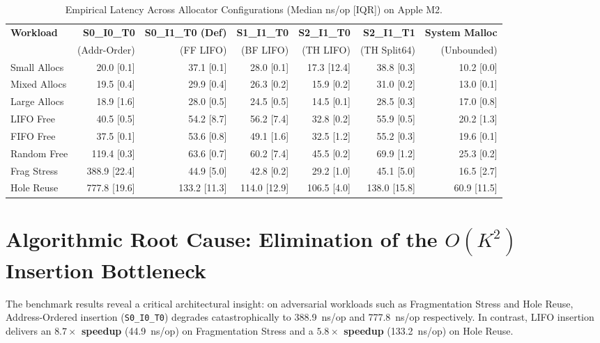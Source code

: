 \documentclass[a4paper,11pt]{report}
\begin{document}
\begin{table}[htbp]
\centering
\caption{Empirical Latency Across Allocator Configurations (Median ns/op [IQR]) on Apple M2.}
\label{tab:bench_results}
\small
\begin{tabularx}{\textwidth}{lrrrrrr}
\toprule
\textbf{Workload} & \textbf{S0\_I0\_T0} & \textbf{S0\_I1\_T0 (Def)} & \textbf{S1\_I1\_T0} & \textbf{S2\_I1\_T0} & \textbf{S2\_I1\_T1} & \textbf{System Malloc} \\
& (Addr-Order) & (FF LIFO) & (BF LIFO) & (TH LIFO) & (TH Split64) & (Unbounded) \\
\midrule
Small Allocs  & 20.0 [0.1] & 37.1 [0.1] & 28.0 [0.1] & 17.3 [12.4] & 38.8 [0.3] & 10.2 [0.0] \\
Mixed Allocs  & 19.5 [0.4] & 29.9 [0.4] & 26.3 [0.2] & 15.9 [0.2]  & 31.0 [0.2] & 13.0 [0.1] \\
Large Allocs  & 18.9 [1.6] & 28.0 [0.5] & 24.5 [0.5] & 14.5 [0.1]  & 28.5 [0.3] & 17.0 [0.8] \\
LIFO Free     & 40.5 [0.5] & 54.2 [8.7] & 56.2 [7.4] & 32.8 [0.2]  & 55.9 [0.5] & 20.2 [1.3] \\
FIFO Free     & 37.5 [0.1] & 53.6 [0.8] & 49.1 [1.6] & 32.5 [1.2]  & 55.2 [0.3] & 19.6 [0.1] \\
Random Free   & 119.4 [0.3]& 63.6 [0.7] & 60.2 [7.4] & 45.5 [0.2]  & 69.9 [1.2] & 25.3 [0.2] \\
Frag Stress   & 388.9 [22.4]& 44.9 [5.0]& 42.8 [0.2] & 29.2 [1.0]  & 45.1 [5.0] & 16.5 [2.7] \\
Hole Reuse    & 777.8 [19.6]& 133.2 [11.3]& 114.0 [12.9]& 106.5 [4.0]& 138.0 [15.8]& 60.9 [11.5] \\
\bottomrule
\end{tabularx}
\end{table}

\section{Algorithmic Root Cause: Elimination of the $O(K^2)$ Insertion Bottleneck}
The benchmark results reveal a critical architectural insight: on adversarial workloads such as Fragmentation Stress and Hole Reuse, Address-Ordered insertion (\texttt{S0\_I0\_T0}) degrades catastrophically to 388.9~ns/op and 777.8~ns/op respectively. In contrast, LIFO insertion delivers an \textbf{$8.7\times$ speedup} (44.9~ns/op) on Fragmentation Stress and a \textbf{$5.8\times$ speedup} (133.2~ns/op) on Hole Reuse.
\end{document}
